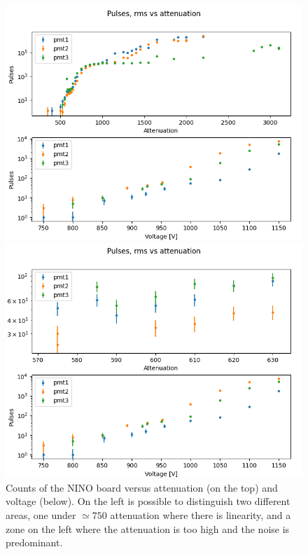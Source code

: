 \documentclass[10pt,a4paper]{article}
\begin{document}
\begin{figure}[hbtp]
\centering
\begin{minipage}[b]{0.45\textwidth}
\includegraphics[width=\textwidth]{figures/Attenuation(good).png}
\end{minipage}
\begin{minipage}[b]{0.45\textwidth}
\includegraphics[width=\textwidth]{figures/around 580-630.png} 
\end{minipage}
\caption{Counts of the NINO board versus attenuation (on the top) and voltage (below). On the left is possible to distinguish two different areas, one under $\simeq 750$ attenuation where there is linearity, and a zone on the left where the attenuation is too high and the noise is predominant.}
\label{fig:Attenuation}
\end{figure}
\end{document}
